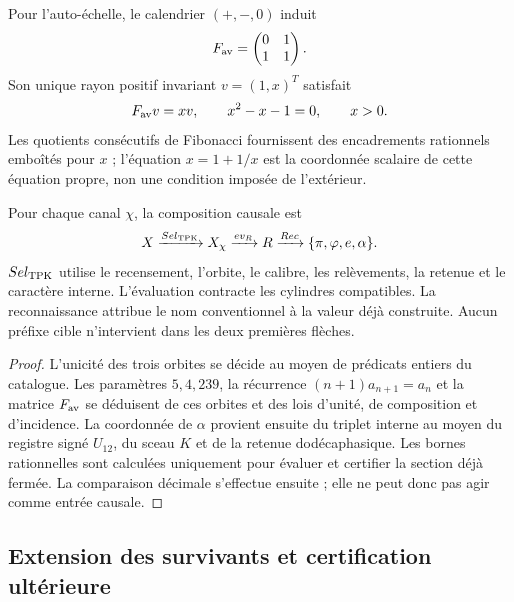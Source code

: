 Pour l'auto-échelle, le calendrier \((+,-,0)\) induit
\[
 F_{\rm av}=\begin{pmatrix}0&1\\1&1\end{pmatrix}.
\]
Son unique rayon positif invariant \(v=(1,x)^T\) satisfait
\[
 F_{\rm av}v=xv,\qquad x^2-x-1=0,\qquad x>0.
\]
Les quotients consécutifs de Fibonacci fournissent des encadrements rationnels
emboîtés pour \(x\) ; l'équation \(x=1+1/x\) est la coordonnée scalaire de
cette équation propre, non une condition imposée de l'extérieur.

\begin{proposition}
\label{prop:generacion-monodromica-separacion-causal-rev7}
Pour chaque canal \(\chi\), la composition causale est
\[
 \widehat X
 \xrightarrow{\operatorname{Sel}_{\rm TPK}}
 X_\chi
 \xrightarrow{\operatorname{ev}_{\mathbb R}}
 \mathbb R
 \xrightarrow{\operatorname{Rec}}
 \{\pi,\varphi,e,\alpha\}.
\]
\(\operatorname{Sel}_{\rm TPK}\) utilise le recensement, l'orbite, le calibre,
les relèvements, la retenue et le caractère interne. L'évaluation contracte
les cylindres compatibles. La reconnaissance attribue le nom conventionnel
à la valeur déjà construite. Aucun préfixe cible n'intervient dans les deux premières
flèches.
\end{proposition}

\begin{proof}
L'unicité des trois orbites se décide au moyen de prédicats entiers du
catalogue. Les paramètres \(5,4,239\), la récurrence
\((n+1)a_{n+1}=a_n\) et la matrice \(F_{\rm av}\) se déduisent de ces orbites et
des lois d'unité, de composition et d'incidence. La coordonnée de
\(\alpha\) provient ensuite du triplet interne au moyen du registre signé
\(U_{12}\), du sceau \(K\) et de la retenue dodécaphasique. Les bornes rationnelles sont
calculées uniquement pour évaluer et certifier la section déjà fermée. La
comparaison décimale s'effectue ensuite ; elle ne peut donc pas agir comme
entrée causale.
\end{proof}

\subsection{Extension des survivants et certification ultérieure}

